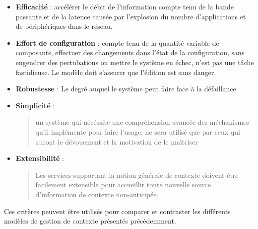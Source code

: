 \begin{itemize}
    \item \textbf{Efficacité} : 
	    accélérer le débit de l'information compte tenu de la bande passante
	    et de la latence causée par l'explosion du nombre d'applications et
	    de périphériques dans le réseau.
    \item \textbf{Effort de configuration} : 
	    compte tenu de la quantité variable de composants, effectuer des
	    changements dans l'état de la configuration, sans engendrer des
	    pertubations ou mettre le système en échec, n'est pas une tâche
	    fastidieuse. Le modèle doit s'assurer que l'édition est sans danger.
    \item \textbf{Robustesse} : 
	    Le degré auquel le système peut faire face à la défaillance
    \item \textbf{Simplicité} : 
            \begin{quotation}
              un système qui nécéssite une compréhension avancée des méchanismes 
	      qu'il implémente pour faire l'usage, ne sera utilisé que par ceux
	      qui auront le dévouement et la motivation de le maîtriser
	      \cite{winograd_architectures_2001}
            \end{quotation}
    \item \textbf{Extensibilité} : 
            \begin{quotation}
              Les services supportant la notion générale de contexte doivent
	      être facilement extensible pour accueillir toute nouvelle source
	      d'information de contexte non-anticipée. \cite{ebling_issues_2001}
            \end{quotation}
\end{itemize}

Ces critères peuvent être utilisés pour comparer et contraster les différents
modèles de gestion de contexte présentés précédemment.

